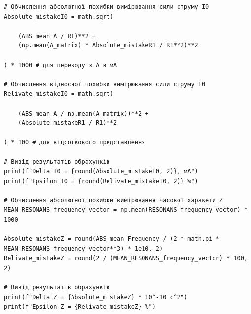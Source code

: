 \documentclass[12pt, a4paper]{article}
\begin{document}
{\begin{verbatim}
# Обчислення абсолютної похибки вимірювання сили струму I0
Absolute_mistakeI0 = math.sqrt(

    (ABS_mean_A / R1)**2 +
    (np.mean(A_matrix) * Absolute_mistakeR1 / R1**2)**2

) * 1000 # для переводу з А в мА

# Обчислення відносної похибки вимірювання сили струму I0
Relivate_mistakeI0 = math.sqrt(

    (ABS_mean_A / np.mean(A_matrix))**2 +
    (Absolute_mistakeR1 / R1)**2

) * 100 # для відсоткового представлення

# Вивід результатів обрахунків
print(f"Delta I0 = {round(Absolute_mistakeI0, 2)}, мА")
print(f"Epsilon I0 = {round(Relivate_mistakeI0, 2)} %")

# Обчислення абсолютної похибки вимірювання часової харакети Z
MEAN_RESONANS_frequency_vector = np.mean(RESONANS_frequency_vector) * 1000

Absolute_mistakeZ = round(ABS_mean_Frequency / (2 * math.pi *
MEAN_RESONANS_frequency_vector**3) * 1e10, 2)
Relivate_mistakeZ = round(2 / (MEAN_RESONANS_frequency_vector) * 100, 2)

# Вивід результатів обрахунків
print(f"Delta Z = {Absolute_mistakeZ} * 10^-10 с^2")
print(f"Epsilon Z = {Relivate_mistakeZ} %")
    \end{verbatim}
    }
\end{document}
